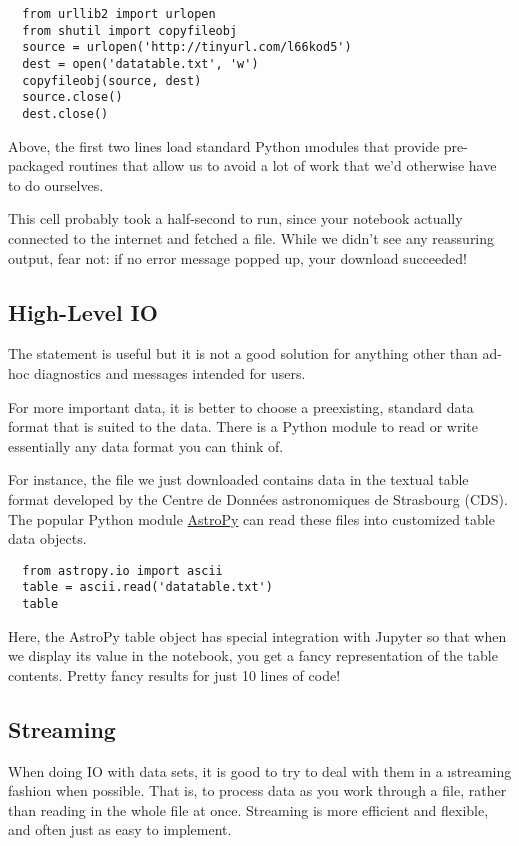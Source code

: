 \documentclass[letterpaper, 12pt, titlepage, twoside]{article}
\begin{document}
\begin{lstlisting}
  from urllib2 import urlopen
  from shutil import copyfileobj
  source = urlopen('http://tinyurl.com/l66kod5')
  dest = open('datatable.txt', 'w')
  copyfileobj(source, dest)
  source.close()
  dest.close()
\end{lstlisting}

Above, the first two lines load standard Python \i{modules} that provide
pre-packaged routines that allow us to avoid a lot of work that we'd otherwise
have to do ourselves.

This cell probably took a half-second to run, since your notebook actually
connected to the internet and fetched a file. While we didn't see any
reassuring output, fear not: if no error message popped up, your download
succeeded!

\subsection*{High-Level IO}

The  statement is useful but it is not a good solution for anything
other than ad-hoc diagnostics and messages intended for users.

For more important data, it is better to choose a preexisting, standard data
format that is suited to the data. There is a Python module to read or write
essentially any data format you can think of.

For instance, the file we just downloaded contains data in the textual table
format developed by the Centre de Données astronomiques de Strasbourg (CDS).
The popular Python module \href{http://www.astropy.org/}{AstroPy} can read
these files into customized table data objects.

\begin{lstlisting}
  from astropy.io import ascii
  table = ascii.read('datatable.txt')
  table
\end{lstlisting}

Here, the AstroPy table object has special integration with Jupyter so that
when we display its value in the notebook, you get a fancy representation of
the table contents. Pretty fancy results for just 10 lines of code!

\subsection*{Streaming}

When doing IO with data sets, it is good to try to deal with them in a
\i{streaming} fashion when possible. That is, to process data as you work
through a file, rather than reading in the whole file at once. Streaming is
more efficient and flexible, and often just as easy to implement.
\end{document}
